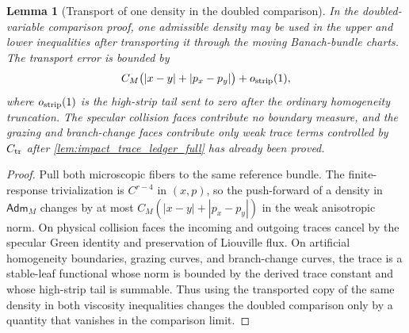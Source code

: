 \documentclass[12pt, letterpaper]{amsart}
\newcommand{\Adm}{\mathsf{Adm}}
\theoremstyle{plain}
\newtheorem{lemma}[theorem]{Lemma}
\theoremstyle{definition}
\theoremstyle{remark}
\begin{document}
\begin{lemma}[Transport of one density in the doubled comparison]
\label{lem:same_density_transport_comparison}
In the doubled-variable comparison proof, one admissible density may be used in
the upper and lower inequalities after transporting it through the moving
Banach-bundle charts.  The transport error is bounded by
\begin{equation}
    C_M\bigl(|x-y|+|p_x-p_y|\bigr)+o_{\rm strip}(1),
\end{equation}
where $o_{\rm strip}(1)$ is the high-strip tail sent to zero after the ordinary
homogeneity truncation.  The specular collision faces contribute no boundary
measure, and the grazing and branch-change faces contribute only weak trace
terms controlled by $C_{\rm tr}$ after \cref{lem:impact_trace_ledger_full} has
already been proved.
\end{lemma}

\begin{proof}
Pull both microscopic fibers to the same reference bundle.  The finite-response
trivialization is $C^{r-4}$ in $(x,p)$, so the push-forward of a density in
$\Adm_M$ changes by at most $C_M(|x-y|+|p_x-p_y|)$ in the weak anisotropic norm.
On physical collision faces the incoming and outgoing traces cancel by the
specular Green identity and preservation of Liouville flux.  On artificial
homogeneity boundaries, grazing curves, and branch-change curves, the trace is
a stable-leaf functional whose norm is bounded by the derived trace constant
and whose high-strip tail is summable.  Thus using the transported copy of the
same density in both viscosity inequalities changes the doubled comparison only
by a quantity that vanishes in the comparison limit.
\end{proof}
\end{document}
